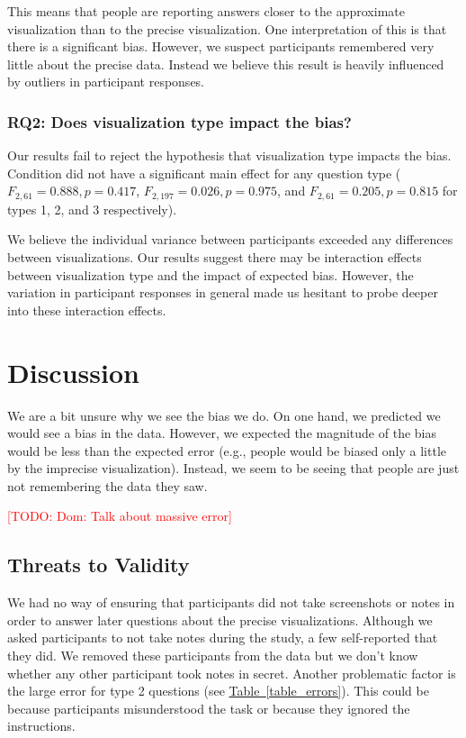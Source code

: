 \documentclass[10pt,journal,compsoc]{IEEEtran}
\newcommand{\tabref}[1]{\hyperref[#1]{Table~\ref*{#1}}}
\newcommand{\note}[2]{\textcolor{#1}{[#2]}}
\newcommand{\todo}[1]{\note{red}{TODO: #1}}
\begin{document}
This means that people are reporting answers closer to the approximate visualization than to the precise visualization.
One interpretation of this is that there is a significant bias.
However, we suspect participants remembered very little about the precise data.
Instead we believe this result is heavily influenced by outliers in participant responses.

\subsubsection{RQ2: Does visualization type impact the bias?}

Our results fail to reject the hypothesis that visualization type impacts the bias.
Condition did not have a significant main effect for any question type ($F_{2,61}=0.888, p=0.417$, $F_{2,197}=0.026, p=0.975$, and $F_{2,61}=0.205, p=0.815$ for types 1, 2, and 3 respectively).


We believe the individual variance between participants exceeded any differences between visualizations.
Our results suggest there may be interaction effects between visualization type and the impact of expected bias.
However, the variation in participant responses in general made us hesitant to probe deeper into these interaction effects.

\section{Discussion}\label{sec:discussion}

We are a bit unsure why we see the bias we do.
On one hand, we predicted we would see a bias in the data.
However, we expected the magnitude of the bias would be less than the expected error (e.g., people would be biased only a little by the imprecise visualization).
Instead, we seem to be seeing that people are just not remembering the data they saw.

\todo{Dom: Talk about massive error}

\subsection{Threats to Validity} %

We had no way of ensuring that participants did not take screenshots or notes in order to answer later questions about the precise visualizations.
Although we asked participants to not take notes during the study, a few self-reported that they did.
We removed these participants from the data but we don't know whether any other participant took notes in secret.
Another problematic factor is the large error for type 2 questions (see \tabref{table_errors}).
This could be because participants misunderstood the task or because they ignored the instructions.
\end{document}
